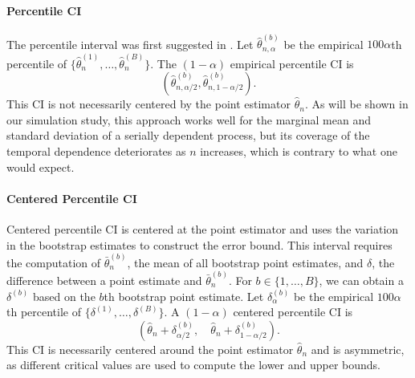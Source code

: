 \documentclass[12pt, letterpaper, titlepage]{article}
\begin{document}
\paragraph{Percentile CI}
The percentile interval was first suggested in \citet{efron1979bootstrap}.
Let $\hat\theta_{n, \alpha}^{(b)}$ be the empirical $100\alpha$th percentile of
$\{\hat\theta_n^{(1)}, \ldots, \hat\theta_n^{(B)}\}$. The $(1 - \alpha)$
empirical percentile CI is
\[
(\hat\theta_{n, \alpha/2}^{(b)}, \hat\theta_{n, 1 - \alpha/2}^{(b)}).
\]
This CI is not necessarily centered by the point estimator $\hat\theta_n$.
As will be shown in our simulation study, this approach works well for the
marginal mean and standard deviation of a serially dependent process, but its
coverage of the temporal dependence deteriorates as $n$ increases, which is
contrary to what one would expect.


\paragraph{Centered Percentile CI}
Centered percentile CI is centered at the point estimator and uses the
variation
in the bootstrap estimates to construct the error bound. This interval requires
the computation of $\bar\theta_n^{(b)}$, the mean of all bootstrap point
estimates, and $\delta$, the difference between a point estimate and
$\bar\theta_n^{(b)}$. For $b \in \{1, \ldots, B\}$, we can obtain a
$\delta^{(b)}$ based on the $b$th bootstrap point estimate. Let
$\delta_{\alpha}^{(b)}$ be the empirical $100\alpha$th percentile of
$\{\delta^{(1)}, \ldots,  \delta^{(B)}\}$.  
A $(1 - \alpha)$ centered percentile CI is
\[
(\hat{\theta}_{n} + \delta^{(b)}_{\alpha/2}, \quad
\hat{\theta}_{n} + \delta^{(b)}_{1 - \alpha/2}).
\]
This CI is necessarily centered around the point estimator $\hat\theta_n$ and
is asymmetric, as different critical values are used to compute
the lower and upper bounds.
\end{document}
